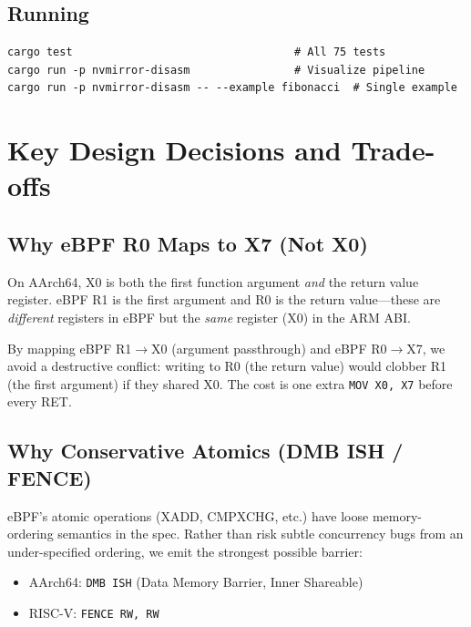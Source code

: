 \documentclass[11pt,letterpaper]{article}
\begin{document}
\subsection{Running}

\begin{lstlisting}[style=asm]
cargo test                                  # All 75 tests
cargo run -p nvmirror-disasm                # Visualize pipeline
cargo run -p nvmirror-disasm -- --example fibonacci  # Single example
\end{lstlisting}

\section{Key Design Decisions and Trade-offs}

\subsection{Why eBPF R0 Maps to X7 (Not X0)}

On AArch64, X0 is both the first function argument \emph{and} the return value register. eBPF R1 is the first argument and R0 is the return value---these are \emph{different} registers in eBPF but the \emph{same} register (X0) in the ARM ABI.

By mapping eBPF R1$\to$X0 (argument passthrough) and eBPF R0$\to$X7, we avoid a destructive conflict: writing to R0 (the return value) would clobber R1 (the first argument) if they shared X0. The cost is one extra \texttt{MOV X0, X7} before every RET.

\subsection{Why Conservative Atomics (DMB ISH / FENCE)}

eBPF's atomic operations (XADD, CMPXCHG, etc.) have loose memory-ordering semantics in the spec. Rather than risk subtle concurrency bugs from an under-specified ordering, we emit the strongest possible barrier:
\begin{itemize}
    \item AArch64: \texttt{DMB ISH} (Data Memory Barrier, Inner Shareable)
    \item RISC-V: \texttt{FENCE RW, RW}
\end{itemize}
\end{document}
